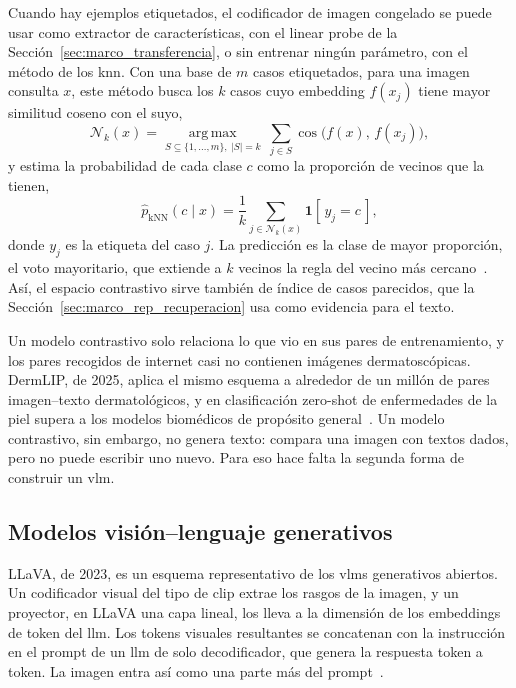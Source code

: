 Cuando hay ejemplos etiquetados, el codificador de imagen congelado se puede usar como extractor de
características, con el linear probe de la Sección~\ref{sec:marco_transferencia}, o sin entrenar ningún
parámetro, con el método de los \gls{knn}. Con una base de $m$ casos etiquetados, para una imagen consulta $x$,
este método busca los $k$ casos cuyo embedding $f(x_j)$ tiene mayor similitud coseno con el suyo,
\begin{equation}
    \mathcal{N}_k(x) = \operatorname*{arg\,max}_{S \subseteq \{1,\dots,m\},\ |S| = k}\ \sum_{j \in S}
    \cos\bigl(f(x),\, f(x_j)\bigr),
    \label{eq:marco_vecinos}
\end{equation}
y estima la probabilidad de cada clase $c$ como la proporción de vecinos que la tienen,
\begin{equation}
    \hat{p}_{\text{kNN}}(c \mid x) = \frac{1}{k}\sum_{j \in \mathcal{N}_k(x)} \mathbf{1}[\,y_j = c\,],
    \label{eq:marco_knn}
\end{equation}
donde $y_j$ es la etiqueta del caso $j$. La predicción es la clase de mayor proporción, el voto mayoritario, que
extiende a $k$ vecinos la regla del vecino más cercano~\cite{cover1967nearest}. Así, el espacio contrastivo
sirve también de índice de casos parecidos, que la Sección~\ref{sec:marco_rep_recuperacion} usa como evidencia
para el texto.

Un modelo contrastivo solo relaciona lo que vio en sus pares de entrenamiento, y los pares recogidos de internet
casi no contienen imágenes dermatoscópicas. DermLIP, de 2025, aplica el mismo esquema a alrededor de un millón
de pares imagen--texto dermatológicos, y en clasificación zero-shot de enfermedades de la piel supera a los
modelos biomédicos de propósito general~\cite{yan2025derm1miccv}. Un modelo contrastivo, sin embargo, no genera
texto: compara una imagen con textos dados, pero no puede escribir uno nuevo. Para eso hace falta la segunda
forma de construir un \gls{vlm}.

\subsection{Modelos visión--lenguaje generativos}
\label{sec:marco_vlm_generativos}

LLaVA, de 2023, es un esquema representativo de los \glspl{vlm} generativos abiertos. Un codificador visual del
tipo de \gls{clip} extrae los rasgos de la imagen, y un proyector, en LLaVA una capa lineal, los lleva a la
dimensión de los embeddings de token del \gls{llm}. Los tokens visuales resultantes se concatenan con la
instrucción en el prompt de un \gls{llm} de solo decodificador, que genera la respuesta token a
token. La imagen entra así como una parte más del prompt~\cite{liu2023visual}.

